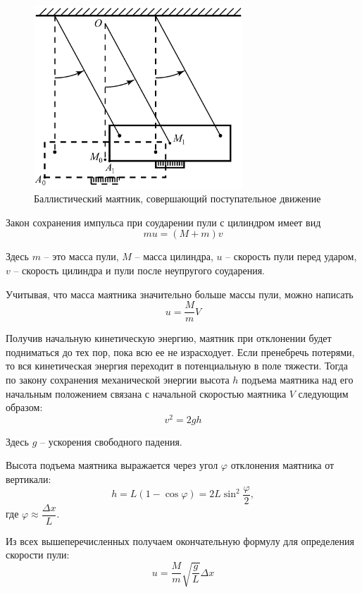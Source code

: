 \documentclass[a4paper,12pt]{article}
\begin{document}
\begin{figure}[h]
    \centering
    \includegraphics[width=0.7\textwidth]{1.2.1 2}
    \caption{Баллистический маятник, совершающий поступательное движение}
    \label{2}
\end{figure}

Закон сохранения импульса при соударении пули с цилиндром имеет вид 
$$
mu = (M + m)v
$$

Здесь $m$ -- это масса пули, $M$ -- масса цилиндра, $u$ -- скорость пули перед ударом, $v$ -- скорость цилиндра и пули после неупругого соударения.

Учитывая, что масса маятника значительно больше массы пули, можно написать
$$
u = \frac{M}{m}V
$$

Получив начальную кинетическую энергию, маятник при отклонении будет подниматься до тех пор, пока всю ее не израсходует. Если пренебречь потерями, то вся кинетическая энергия переходит в потенциальную в поле тяжести. Тогда по закону сохранения механической энергии высота $h$ подъема маятника над его начальным положением связана с начальной скоростью маятника $V$ следующим образом: 
$$
v^2 = 2gh
$$

Здесь $g$ -- ускорения свободного падения.

Высота подъема маятника выражается через угол $\varphi$ отклонения маятника от вертикали: 
$$
h = L(1 - \cos{\varphi}) = 2L \sin^2{\frac{\varphi}{2}},
$$
где $\varphi \approx \dfrac{\Delta x}{L}$.

Из всех вышеперечисленных получаем окончательную формулу для определения скорости пули:
\begin{equation}
\label{eq_vel}
u = \frac{M}{m}\sqrt{\frac{g}{L}}\Delta x
\end{equation}
\end{document}
